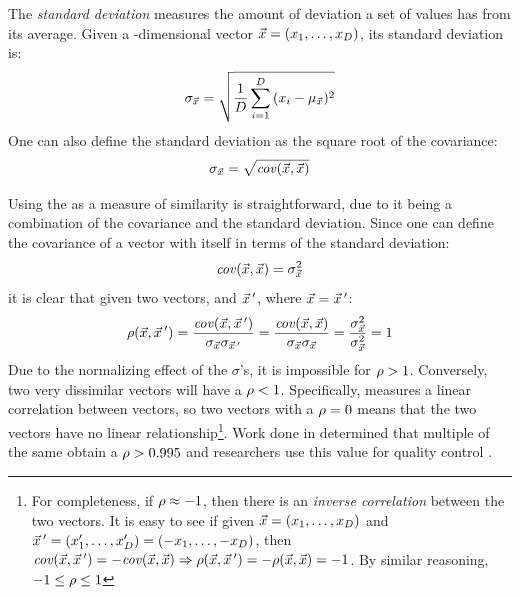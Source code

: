 The \textit{standard deviation} measures the amount of deviation a set of values has from its average.
Given a \numdims{}-dimensional vector $\vec{x}{}=(x{}_1,\dots,x{}_{D})$, its standard deviation is:
\begin{equation}
    \sigma_{\vec{x{}}} =  \sqrt{\frac{1}{D{}}\sum_{i=1}^{D}{}(x{}_i - \mu_{\vec{x{}}})^2}  
\end{equation}
One can also define the standard deviation as the square root of the covariance:
\begin{equation}
    \sigma_{\vec{x{}}} = \sqrt{\mathit{cov}(\vec{x{}}, \vec{x{}})}
\end{equation}

Using the \pearson{} as a measure of similarity is straightforward, due to it being a combination of the covariance and the standard deviation.
Since one can define the covariance of a vector with itself in terms of the standard deviation:
\begin{equation}
    \mathit{cov}(\vec{x{}}, \vec{x{}}) = \sigma_{\vec{x{}}}^2
\end{equation}
it is clear that given two vectors, \pcveca{} and $\vec{x}{}\,'$, where $\vec{x}{} = \vec{x}\,'{}$:
\begin{equation}
    \rho({\vec{x}{}},{\vec{x}\,'{}})
    = \frac{\mathit{cov}(\vec{x}{}, \vec{x}\,'{})}{\sigma_{\vec{x}{}}\sigma_{\vec{x}\,'{}}}
    = \frac{\mathit{cov}(\vec{x}{}, \vec{x}{})}{\sigma_{\vec{x}{}}\sigma_{\vec{x}{}}}
    = \frac{\sigma_{\vec{x}{}}^2}{\sigma_{\vec{x}{}}^2}
    = 1
\end{equation}
Due to the normalizing effect of the $\sigma{}$'s, it is impossible for $\rho{} > 1$.
Conversely, two very dissimilar vectors will have a $\rho{} < 1$.
Specifically, \pearson{} measures a linear correlation between vectors, so two vectors with a $\rho{} = 0$ means that the two vectors have no linear relationship\footnote{For completeness, if $\rho{} \approx -1$, then there is an \textit{inverse correlation} between the two vectors. It is easy to see if 
given $\vec{x}{} = (x{}_1,\dots,x{}_{D}{})$
and $\vec{x}\,'{}=(x{}'_1,\dots,x{}'_{D}{}) = (-x{}_1,\dots,-x{}_{D}{})$,
then $\mathit{cov}(\vec{x}{}, \vec{x}\,'{}) = -\mathit{cov}(\vec{x{}}, \vec{x{}})\Rightarrow\rho{(\ensuremath{\vec{x}}{}, \ensuremath{\vec{x}\,'}{}) = -\ensuremath{\rho{}(\vec{x{}}, \vec{x{}})}} = -1$. By similar reasoning, $-1 \leq \rho{} \leq 1$
}.
Work done in \cite{Shealy:SeniorProject} determined that multiple \pyros{} of the same \isol{} obtain a $\rho{} > 0.995$ and \cplop{} researchers use this value for quality control \cite{kent2014pyroprinting, Black2014121}.

